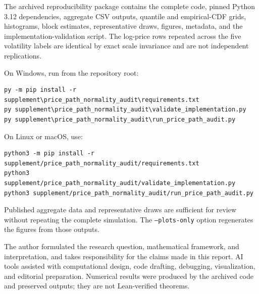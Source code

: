 \documentclass[10pt]{article}
\begin{document}
The archived reproducibility package contains the complete code, pinned Python
3.12 dependencies, aggregate CSV outputs, quantile and empirical-CDF grids,
histograms, block estimates, representative draws, figures, metadata, and the
implementation-validation script.  The log-price rows repeated across the five
volatility labels are identical by exact scale invariance and are not
independent replications.

On Windows, run from the repository root:
\begin{verbatim}
py -m pip install -r supplement\price_path_normality_audit\requirements.txt
py supplement\price_path_normality_audit\validate_implementation.py
py supplement\price_path_normality_audit\run_price_path_audit.py
\end{verbatim}
On Linux or macOS, use:
\begin{verbatim}
python3 -m pip install -r supplement/price_path_normality_audit/requirements.txt
python3 supplement/price_path_normality_audit/validate_implementation.py
python3 supplement/price_path_normality_audit/run_price_path_audit.py
\end{verbatim}
Published aggregate data and representative draws are sufficient for review
without repeating the complete simulation.  The \texttt{--plots-only} option
regenerates the figures from those outputs.

\medskip
\noindent
The author formulated the research question, mathematical framework, and
interpretation, and takes responsibility for the claims made in this report.
AI tools assisted with computational design, code drafting, debugging,
visualization, and editorial preparation.  Numerical results were produced by
the archived code and preserved outputs; they are not Lean-verified theorems.
\end{document}
